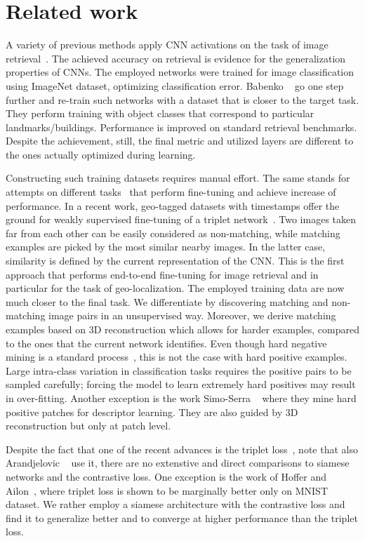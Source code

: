 \section{Related work}
%
A variety of previous methods apply CNN activations on the task of image retrieval~\cite{GWGL14,RSMC14,BL15,KMO15,TSJ16,ZZWWT16}.
The achieved accuracy on retrieval is evidence for the generalization properties of CNNs. 
The employed networks were trained for image classification using ImageNet dataset, optimizing classification error.
Babenko \etal~\cite{BSCL14} go one step further and re-train such networks with a dataset that is closer to the target task.
They perform training with object classes that correspond to particular landmarks/buildings. 
Performance is improved on standard retrieval benchmarks.
Despite the achievement, still, the final metric and utilized layers are different to the ones actually optimized during learning.

Constructing such training datasets requires manual effort. 
The same stands for attempts on different tasks~\cite{RASC14,TSJ16} that perform fine-tuning and achieve increase of performance.
In a recent work, geo-tagged datasets with timestamps offer the ground for weakly supervised fine-tuning of a triplet network~\cite{AGTPS15}. 
Two images taken far from each other can be easily considered as non-matching, while matching examples are picked by the most similar nearby images. 
In the latter case, similarity is defined by the current representation of the CNN.
This is the first approach that performs end-to-end fine-tuning for image retrieval and in particular for the task of geo-localization.
The employed training data are now much closer to the final task.
We differentiate by discovering matching and non-matching image pairs in an unsupervised way.
Moreover, we derive matching examples based on 3D reconstruction which allows for harder examples, compared to the ones that the current network identifies. 
Even though hard negative mining is a standard process~\cite{GDDM14,AGTPS15}, this is not the case with hard positive examples. 
Large intra-class variation in classification tasks requires the positive pairs to be sampled carefully;  forcing the model to learn  extremely hard positives may result in over-fitting.
Another exception is the work Simo-Serra \etal~\cite{STFKM14} where they mine hard positive patches for descriptor learning. 
They are also guided by 3D reconstruction but only at patch level.

Despite the fact that one of the recent advances is the triplet loss~\cite{WSLT+14,SKP15,HA15}, note that also Arandjelovic \etal~\cite{AGTPS15} use it, there are no extenstive and direct comparisons to siamese networks and the contrastive loss. 
One exception is the work of Hoffer and Ailon~\cite{HA15}, where triplet loss is shown to be marginally better only on MNIST dataset.
We rather employ a siamese architecture with the contrastive loss and find it to generalize better and to converge at higher performance than the triplet loss.
